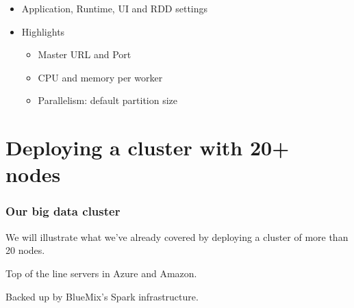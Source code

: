 \documentclass{beamer}
\begin{document}
\begin{frame}
  \begin{itemize}
    \item Application, Runtime, UI and RDD settings
    \item Highlights
      \begin{itemize}
        \item Master URL and Port
        \item CPU and memory per worker
        \item Parallelism: default partition size
      \end{itemize}
    
  \end{itemize}
\end{frame}


\section{Deploying a cluster with 20+ nodes}
\begin{frame}
  \frametitle{Our big data cluster}

  We will illustrate what we've already covered by deploying a cluster of more than 20 nodes.
  \pause
  
  Top of the line servers in Azure and Amazon.
  \pause

  Backed up by BlueMix's Spark infrastructure.
  
\end{frame}
\begin{frame}[plain]

\end{frame}
\end{document}
